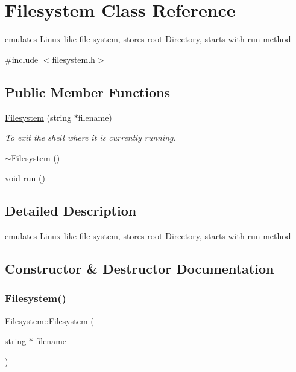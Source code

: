 \hypertarget{class_filesystem}{}\section{Filesystem Class Reference}
\label{class_filesystem}


emulates Linux like file system, stores root \hyperlink{class_directory}{Directory}, starts with run method  




{\ttfamily \#include $<$filesystem.\+h$>$}

\subsection*{Public Member Functions}
\begin{DoxyCompactItemize}
\item 
\hyperlink{class_filesystem_aac89cbe467cc517e80049e0277812040}{Filesystem} (string $\ast$filename)
\begin{DoxyCompactList}\small\item\em To exit the shell where it is currently running. \end{DoxyCompactList}\item 
\hyperlink{class_filesystem_a8d4d73d3d4e56fd6792bdb83f6c5dfd8}{$\sim$\+Filesystem} ()
\item 
void \hyperlink{class_filesystem_a373c34da491ec8d269cbc18d52a1ad79}{run} ()
\end{DoxyCompactItemize}


\subsection{Detailed Description}
emulates Linux like file system, stores root \hyperlink{class_directory}{Directory}, starts with run method 

\subsection{Constructor \& Destructor Documentation}
\mbox{\label{class_filesystem_aac89cbe467cc517e80049e0277812040}} 
\subsubsection{\texorpdfstring{Filesystem()}{Filesystem()}}
{\footnotesize\ttfamily Filesystem\+::\+Filesystem (\begin{DoxyParamCaption}\item[{string $\ast$}]{filename }\end{DoxyParamCaption})\hspace{0.3cm}{\ttfamily [inline]}}



